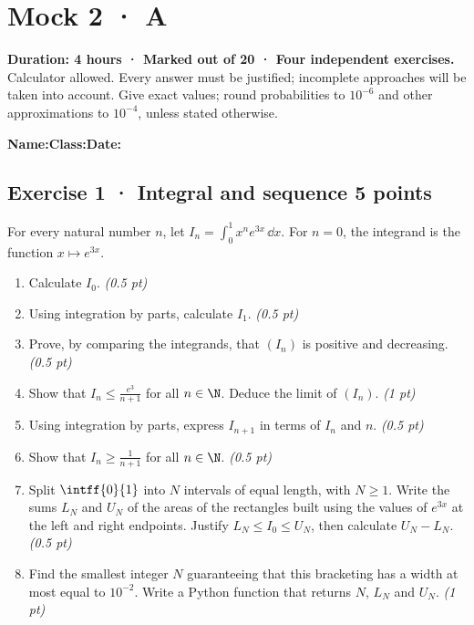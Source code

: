 \fi

\ifmxteacher

\mxnewpage{}\label{sujet:8-3}

\section*{Mock 2 · A}


\textbf{Duration: 4 hours · Marked out of 20 · Four independent exercises.}\\Calculator allowed. Every answer must be justified; incomplete approaches will be taken into account. Give exact values; round probabilities to $10^{-6}$ and other approximations to $10^{-4}$, unless stated otherwise.

\smallskip\textbf{Name:}\enspace\dotfill\quad\textbf{Class:}\enspace\dotfill\quad\textbf{Date:}\enspace\dotfill

\subsection*{Exercise 1 · Integral and sequence \hfill 5 points}For every natural number $n$, let $I_n=\displaystyle\int_0^1x^ne^{3x}\,\dd x$. For $n=0$, the integrand is the function $x\mapsto e^{3x}$.

\begin{enumerate}

\item Calculate $I_0$. \hfill\textit{(0.5 pt)}

\item Using integration by parts, calculate $I_1$. \hfill\textit{(0.5 pt)}

\item Prove, by comparing the integrands, that $(I_n)$ is positive and decreasing. \hfill\textit{(0.5 pt)}

\item Show that $I_n\le\frac{e^{3}}{n+1}$ for all $n\in\N$. Deduce the limit of $(I_n)$. \hfill\textit{(1 pt)}

\item Using integration by parts, express $I_{n+1}$ in terms of $I_n$ and $n$. \hfill\textit{(0.5 pt)}

\item Show that $I_n\ge\frac1{n+1}$ for all $n\in\N$. \hfill\textit{(0.5 pt)}

\item Split $\intff{0}{1}$ into $N$ intervals of equal length, with $N\ge1$. Write the sums $L_N$ and $U_N$ of the areas of the rectangles built using the values of $e^{3x}$ at the left and right endpoints. Justify $L_N\le I_0\le U_N$, then calculate $U_N-L_N$. \hfill\textit{(0.5 pt)}

\item Find the smallest integer $N$ guaranteeing that this bracketing has a width at most equal to $10^{-2}$. Write a Python function that returns $N$, $L_N$ and $U_N$. \hfill\textit{(1 pt)}

\end{enumerate}


